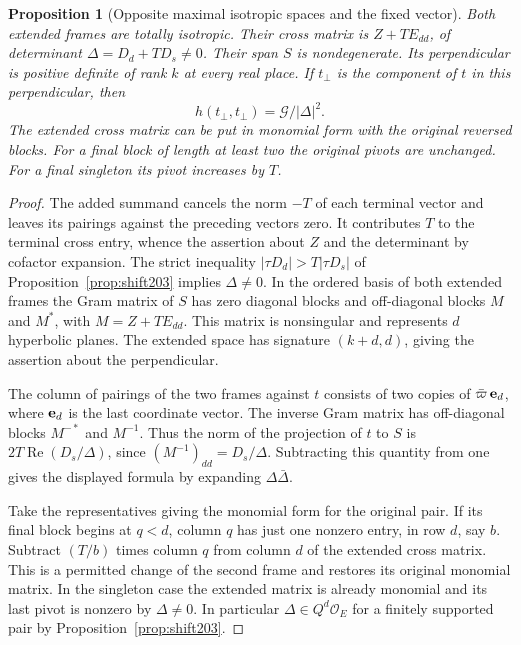 \documentclass[a4paper,11pt]{article}
\newtheorem{proposition}{Proposition}[section]
\theoremstyle{definition}
\theoremstyle{remark}
\numberwithin{equation}{section}
\begin{document}
\begin{proposition}[Opposite maximal isotropic spaces and the fixed vector]\leavevmode
\label{prop:extend300}
Both extended frames are totally isotropic. Their cross matrix is
\(Z+T E_{dd}\), of determinant \(\Delta=D_d+TD_s\ne0\).
Their span \(S\) is nondegenerate. Its perpendicular is positive
definite of rank \(k\) at every real place. If \(t_\perp\) is the
component of \(t\) in this perpendicular, then
\[
              h(t_\perp,t_\perp)=\mathcal G/|\Delta|^2 .
\]
The extended cross matrix can be put in monomial form with the
original reversed blocks. For a final block of length at least two
the original pivots are unchanged. For a final singleton its pivot
increases by \(T\).
\end{proposition}
\begin{proof}
The added summand cancels the norm \(-T\) of each terminal vector
and leaves its pairings against the preceding vectors zero.
It contributes \(T\) to the terminal cross entry, whence the
assertion about \(Z\) and the determinant by cofactor expansion.
The strict inequality \(|\tau D_d|>T|\tau D_s|\) of
Proposition~\ref{prop:shift203} implies \(\Delta\ne0\).
In the ordered basis of both extended frames the Gram matrix of
\(S\) has zero diagonal blocks and off-diagonal blocks \(M\)
and \(M^*\), with \(M=Z+T E_{dd}\). This matrix is nonsingular
and represents \(d\) hyperbolic planes. The extended space has
signature \((k+d,d)\), giving the assertion about the perpendicular.

The column of pairings of the two frames against \(t\) consists
of two copies of \(\bar\varpi\,{\bf e}_d\), where \({\bf e}_d\)
is the last coordinate vector. The inverse Gram matrix has
off-diagonal blocks \(M^{-*}\) and \(M^{-1}\). Thus the norm of
the projection of \(t\) to \(S\) is
\(2T\operatorname{Re}(D_s/\Delta)\), since
\((M^{-1})_{dd}=D_s/\Delta\). Subtracting this quantity from
one gives the displayed formula by expanding \(\Delta\bar\Delta\).

Take the representatives giving the monomial form for the original
pair. If its final block begins at \(q<d\), column \(q\) has just
one nonzero entry, in row \(d\), say \(b\).
Subtract \((T/b)\) times column \(q\) from column \(d\) of
the extended cross matrix. This is a permitted change of the
second frame and restores its original monomial matrix. In the
singleton case the extended matrix is already monomial and its
last pivot is nonzero by \(\Delta\ne0\). In particular
\(\Delta\in Q^d\mathcal O_E\) for a finitely supported pair by
Proposition~\ref{prop:shift203}.
\end{proof}
\end{document}
